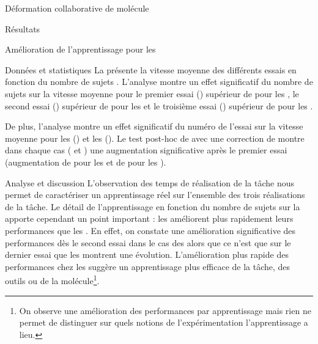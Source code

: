 \documentclass[myfrancais,ngerman,english,french]{mythesis}
\begin{document}
\begin{mychapter}{Déformation collaborative de molécule}
\begin{mysection}{Résultats}
\begin{mysubsection}{Amélioration de l'apprentissage pour les }
\begin{mysubsubsection}{Données et statistiques}
					La  présente la vitesse moyenne  des différents essais  en fonction du nombre de sujets .
					L'analyse montre un effet significatif du nombre de sujets  sur la vitesse moyenne  pour le premier essai () supérieur de  pour les , le second essai () supérieur de  pour les  et le troisième essai () supérieur de  pour les .

					De plus, l'analyse montre un effet significatif du numéro de l'essai  sur la vitesse moyenne  pour les  () et les  ().
					Le test post-hoc de  avec une correction de  montre dans chaque cas ( et ) une augmentation significative après le premier essai (augmentation de  pour les  et de  pour les ).
				\end{mysubsubsection}
				\begin{mysubsubsection}{Analyse et discussion}
					L'observation des temps de réalisation de la tâche  nous permet de caractériser un apprentissage réel sur l'ensemble des trois réalisations de la tâche.
					Le détail de l'apprentissage en fonction du nombre de sujets sur la  apporte cependant un point important : les  améliorent plus rapidement leurs performances que les .
					En effet, on constate une amélioration significative des performances dès le second essai dans le cas des  alors que ce n'est que sur le dernier essai que les  montrent une évolution.
					L'amélioration plus rapide des performances chez les  suggère un apprentissage plus efficace de la tâche, des outils ou de la molécule\footnote{On observe une amélioration des performances par apprentissage mais rien ne permet de distinguer sur quels notions de l'expérimentation l'apprentissage a lieu.}.


\end{mysubsubsection}
\end{mysubsection}
\end{mysection}
\end{mychapter}
\end{document}
